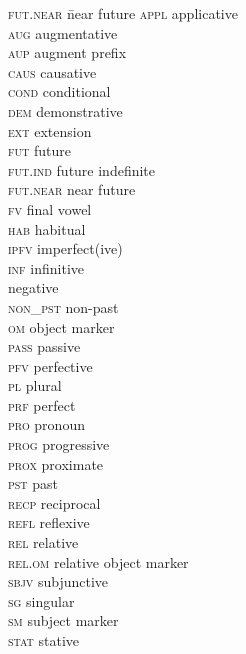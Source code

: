 \documentclass[output=paper,
            colorlinks, citecolor=brown
            ,draftmode
		  ]{langscibook}
\begin{document}
\begin{multicols}{2}
\begin{tabbing}
\textsc{fut.near} \= near future\kill
\textsc{appl} \> applicative\\ 
\textsc{aug} \> augmentative \\ 
\textsc{aup} \> augment prefix \\  
\textsc{caus} \> causative \\ 
\textsc{cond} \> conditional \\  
\textsc{dem} \> demonstrative \\ 
\textsc{ext} \> extension \\ 
\textsc{fut} \> future\\
\textsc{fut.ind} \> future indefinite \\ 
\textsc{fut.near} \> near future \\
\textsc{fv} \> final vowel\\ 
\textsc{hab} \> habitual\\
\textsc{ipfv} \> imperfect(ive)\\
\textsc{inf} \> infinitive\\
 \> negative\\
\textsc{non\_pst} \> non-past\\
\textsc{om} \> object marker\\
\textsc{pass} \> passive\\
\textsc{pfv} \> perfective\\
\textsc{pl} \> plural\\
\textsc{prf} \> perfect\\
\textsc{pro} \> pronoun\\
\textsc{prog} \> progressive\\
\textsc{prox} \> proximate\\
\textsc{pst} \> past\\
\textsc{recp} \> reciprocal\\
\textsc{refl} \> reflexive\\
\textsc{rel} \> relative\\
\textsc{rel.om} \> relative object marker\\
\textsc{sbjv} \> subjunctive\\
\textsc{sg} \> singular\\
\textsc{sm} \> subject marker\\
\textsc{stat} \> stative
\end{tabbing}
\end{multicols}


\sloppy\printbibliography[heading=subbibliography,notkeyword=this]
\end{document}
